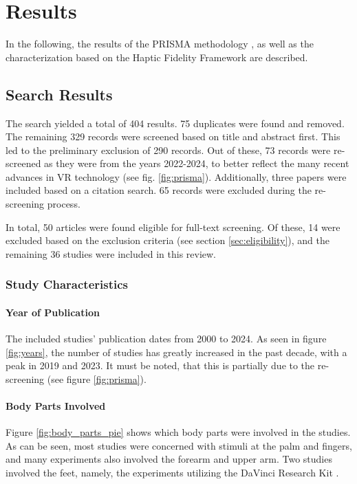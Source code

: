 \section{Results}
\label{sec:results}

In the following, the results of the PRISMA methodology \cite{Page2021TheReviews}, as well as the characterization based on the Haptic Fidelity Framework \cite{Muender2022HapticReality} are described.


\subsection{Search Results}

The search yielded a total of 404 results. 75 duplicates were found and removed. The remaining 329 records were screened based on title and abstract first. This led to the preliminary exclusion of 290 records. Out of these, 73 records were re-screened as they were from the years 2022-2024, to better reflect the many recent advances in VR technology (see fig. \ref{fig:prisma}). 
Additionally, three papers were included based on a citation search. 65 records were excluded during the re-screening process.

In total, 50 articles were found eligible for full-text screening. Of these, 14 were excluded based on the exclusion criteria (see section \ref{sec:eligibility}), and the remaining 36 studies were included in this review.


\subsubsection{Study Characteristics}
\paragraph{Year of Publication}
The included studies' publication dates from 2000 to 2024. As seen in figure \ref{fig:years}, the number of studies has greatly increased in the past decade, with a peak in 2019 and 2023. It must be noted, that this is partially due to the re-screening (see figure \ref{fig:prisma}). 

\paragraph{Body Parts Involved}
Figure \ref{fig:body_parts_pie} shows which body parts were involved in the studies. As can be seen, most studies were concerned with stimuli at the palm and fingers, and many experiments also involved the forearm and upper arm. Two studies involved the feet, namely, the experiments utilizing the DaVinci Research Kit \cite{Caccianiga2021, Oquendo2024}.


